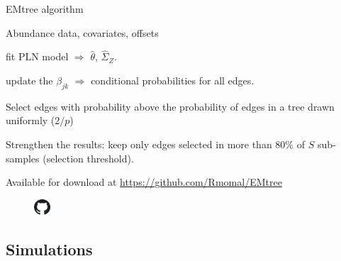 \documentclass[11pt]{beamer}
\newcommand{\emphase}[1]{\textcolor{Complement}{#1}}
\begin{document}
 \begin{frame}{EMtree algorithm}
\begin{description}
\normalsize
\item [Input: ] \hspace{0.35cm}Abundance data, covariates, offsets\vspace{0.2cm}

\item [1rst step: ] \hspace{0.3cm} \emphase{fit PLN model} $\Rightarrow$  $\hat{\theta}$, $\hat{\Sigma}_Z$. \vspace{0.2cm}
\item [2nd step: ] \hspace{0.3cm} \emphase{update the $\beta_{jk}$} $\Rightarrow$ conditional probabilities for all edges.\\ \hspace{0.3cm} 
\bigskip
\item [Thresholding: ] Select edges with probability above the probability of edges in a tree drawn uniformly (\emphase{$2/p$})\vspace{0.2cm}
\item [Resampling: ] \hspace{0.25cm}Strengthen the results: keep only edges selected in more than \emphase{$80\%$} of $S$ sub-samples (selection threshold).
\end{description} \bigskip

Available for download at \url{https://github.com/Rmomal/EMtree}
\begin{figure}
    \centering
    \includegraphics[width=0.6cm]{images/github.png}
\end{figure}
\end{frame}
 \subsection{Simulations}
 
\end{document}

